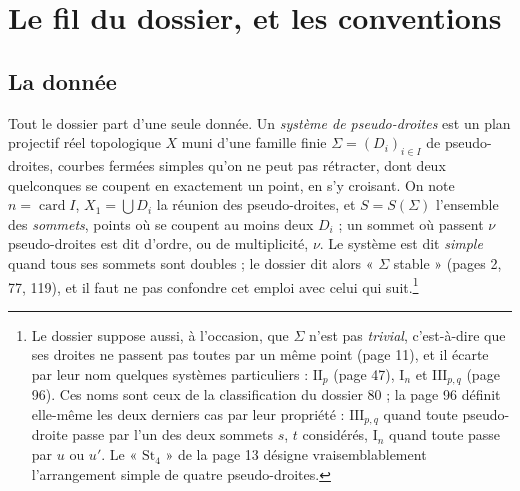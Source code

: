 \documentclass[11pt,a4paper]{article}
\begin{document}
\section*{Le fil du dossier, et les conventions}

\subsection*{La donnée}

Tout le dossier part d'une seule donnée. Un \emph{système de pseudo-droites}
est un plan projectif réel topologique $X$ muni d'une famille finie
$\Sigma = (D_i)_{i \in I}$ de pseudo-droites, courbes fermées simples
qu'on ne peut pas rétracter, dont deux quelconques se coupent en exactement un
point, en s'y croisant. On note $n = \operatorname{card} I$, $X_1 = \bigcup
D_i$ la réunion des pseudo-droites, et $S = S(\Sigma)$ l'ensemble des
\emph{sommets}, points où se coupent au moins deux $D_i$ ; un sommet où passent
$\nu$ pseudo-droites est dit d'ordre, ou de multiplicité, $\nu$. Le système est
dit \emph{simple} quand tous ses sommets sont doubles ; le dossier dit alors
« $\Sigma$ stable » (pages 2, 77, 119), et il faut ne pas confondre cet emploi
avec celui qui suit.\footnote{Le dossier suppose aussi, à l'occasion, que
$\Sigma$ n'est pas \emph{trivial}, c'est-à-dire que ses droites ne passent pas
toutes par un même point (page 11), et il écarte par leur nom quelques
systèmes particuliers : $\mathrm{II}_p$ (page 47), $\mathrm{I}_n$ et
$\mathrm{III}_{p,q}$ (page 96). Ces noms sont ceux de la classification du
dossier 80 ; la page 96 définit elle-même les deux derniers cas par leur
propriété : $\mathrm{III}_{p,q}$ quand toute pseudo-droite passe par l'un des
deux sommets $s$, $t$ considérés, $\mathrm{I}_n$ quand toute passe par $u$ ou
$u'$. Le « $\mathrm{St}_4$ » de la page 13 désigne vraisemblablement
l'arrangement simple de quatre pseudo-droites.}
\end{document}

